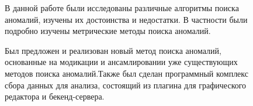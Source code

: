 \Conclusion %

\begin{figure}
В данной работе были исследованы различные алгоритмы поиска аномалий, изучены их достоинства и недостатки. В частности были подробно изучены метрические методы поиска аномалий.

Был предложен и реализован новый метод поиска аномалий, основанные на модикации и ансамлировании уже существующих методов поиска аномалий.Также был сделан программный комплекс сбора данных для анализа, состоящий из плагина для графического редактора и бекенд-сервера.
\end{figure}
